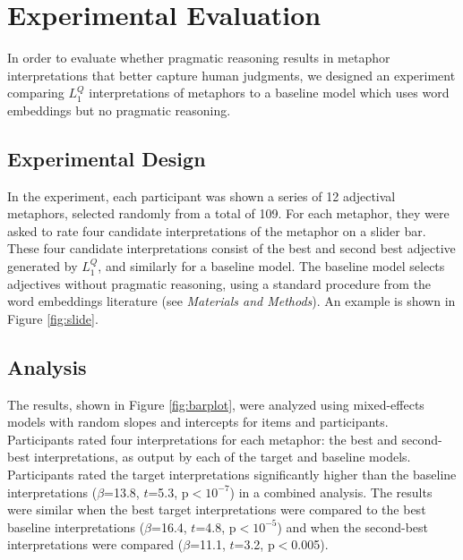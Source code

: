 \documentclass[9pt,twocolumn,twoside,lineno]{pnas-new}
\newcommand{\Listener}{L}
\newcommand{\QLONE}{\Listener_{{1}}^{{Q}}}
\begin{document}
\section{Experimental Evaluation} \label{exp}

	In order to evaluate whether pragmatic reasoning results in metaphor interpretations that better capture human judgments, we designed an experiment comparing $\QLONE$ interpretations of metaphors to a baseline model which uses word embeddings but no pragmatic reasoning.


	\subsection*{Experimental Design}

		In the experiment, each participant was shown a series of 12 adjectival metaphors, selected randomly from a total of 109. For each metaphor, they were asked to rate four candidate interpretations of the metaphor on a slider bar. These four candidate interpretations consist of the best and second best adjective generated by $\QLONE$, and similarly for a baseline model. The baseline model selects adjectives without pragmatic reasoning, using a standard procedure from the word embeddings literature (see \emph{Materials and Methods}). An example is shown in Figure \ref{fig:slide}.


	
	

	\subsection*{Analysis}

		The results, shown in Figure \ref{fig:barplot}, were analyzed using mixed-effects models with random slopes and intercepts for items and participants. Participants rated four interpretations for each metaphor: the best and second-best interpretations, as output by each of the target and baseline models. Participants rated the target interpretations significantly higher than the baseline interpretations ($\beta$=13.8, $t$=5.3, p$<10^{-7}$) in a combined analysis. The results were similar when the best target interpretations were compared to the best baseline interpretations ($\beta$=16.4, $t$=4.8, p$<10^{-5}$) and when the second-best interpretations were compared ($\beta$=11.1, $t$=3.2, p$<$0.005).
\end{document}
